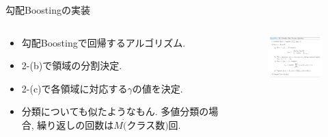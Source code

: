 \documentclass[dvipdfmx,8pt]{beamer}
\begin{document}
  \begin{frame}{勾配Boostingの実装}
    \begin{columns}[t]
      \begin{column}{0.5\linewidth}
        \begin{itemize}
          \item 勾配Boostingで回帰するアルゴリズム.
          \item 2-(b)で領域の分割決定.
          \item 2-(c)で各領域に対応する$\gamma$の値を決定.
          \item 分類についても似たようなもん. 多値分類の場合, 繰り返しの回数は$M \dot (\mbox{クラス数})$回.
        \end{itemize}
      \end{column}
      \begin{column}{0.5\linewidth}
        \begin{figure}[htb]
          \centering
          \includegraphics[width=5cm,clip]{images/GradientBoosting.png}
        \end{figure}
      \end{column}
    \end{columns}
  \end{frame}
\end{document}

